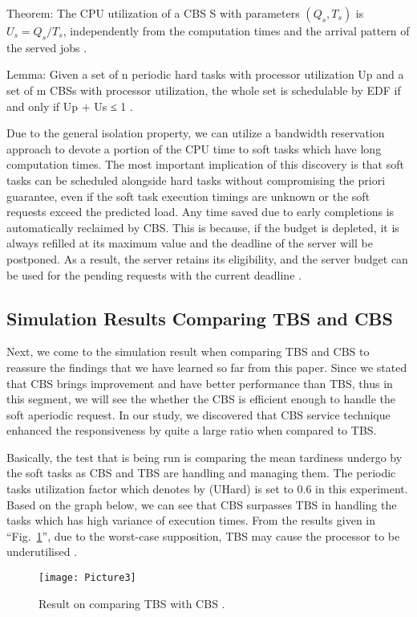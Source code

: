 Theorem:
The CPU utilization of a CBS S with parameters $(Q_{s}, T_{s})$ is $U_{s} = Q_{s}/T_{s}$, independently from the computation times and the arrival pattern of the served jobs \cite{b2}.

Lemma:
Given a set of n periodic hard tasks with processor utilization Up and a set of m CBSs with processor utilization, the whole set is schedulable by EDF if and only if Up + Us ≤ 1 \cite{b2}.

Due to the general isolation property, we can utilize a bandwidth reservation approach to devote a portion of the CPU time to soft tasks which have long computation times. The most important implication of this discovery is that soft tasks can be scheduled alongside hard tasks without compromising the priori guarantee, even if the soft task execution timings are unknown or the soft requests exceed the predicted load. Any time saved due to early completions is automatically reclaimed by CBS. This is because, if the budget is depleted, it is always refilled at its maximum value and the deadline of the server will be postponed. As a result, the server retains its eligibility, and the server budget can be used for the pending requests with the current deadline \cite{b2}. 

\subsection{Simulation Results Comparing TBS and CBS}

Next, we come to the simulation result when comparing TBS and CBS to reassure the findings that we have learned so far from this paper. Since we stated that CBS brings improvement and have better performance than TBS, thus in this segment, we will see the whether the CBS is efficient enough to handle the soft aperiodic request. In our study, we discovered that CBS service technique enhanced the responsiveness by quite a large ratio when compared to TBS.

Basically, the test that is being run is comparing the mean tardiness undergo by the soft tasks as CBS and TBS are handling and managing them. The periodic tasks utilization factor which denotes by (UHard) is set to 0.6 in this experiment. Based on the graph below, we can see that CBS surpasses TBS in handling the tasks which has high variance of execution times. From the results given in ``Fig.~\ref{result}'', due to the worst-case supposition, TBS may cause the processor to be underutilised \cite{b2}.

\begin{figure}[htp]
    \centering
    \texttt{[image: Picture3]}
    \caption{Result on comparing TBS with CBS \cite{b2}.}
    \label{result}
\end{figure}

